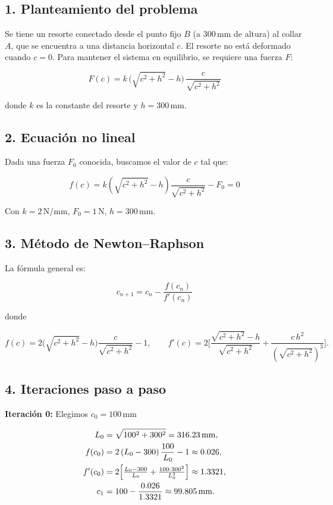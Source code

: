 \documentclass[12pt]{article}
\begin{document}
\subsection*{1. Planteamiento del problema}

Se tiene un resorte conectado desde el punto fijo \(B\) (a \(300\,\mathrm{mm}\) de altura) al collar \(A\), que se encuentra a una distancia horizontal \(c\). El resorte no está deformado cuando \(c = 0\). Para mantener el sistema en equilibrio, se requiere una fuerza \(F\):

\[
F(c) = k \,\bigl(\sqrt{c^2 + h^2} - h\bigr)\,\frac{c}{\sqrt{c^2 + h^2}}
\]

donde \(k\) es la constante del resorte y \(h = 300\,\mathrm{mm}\).

\subsection*{2. Ecuación no lineal}

Dada una fuerza \(F_0\) conocida, buscamos el valor de \(c\) tal que:

\[
f(c) = k \left(\sqrt{c^2 + h^2} - h\right)\frac{c}{\sqrt{c^2 + h^2}} - F_0 = 0
\]

Con \(k = 2\,\mathrm{N/mm}\), \(F_0 = 1\,\mathrm{N}\), \(h = 300\,\mathrm{mm}\).

\subsection*{3. Método de Newton–Raphson}

La fórmula general es:

\[
c_{n+1} = c_n - \frac{f(c_n)}{f'(c_n)}
\]

donde

\[
f(c) = 2\bigl(\sqrt{c^2 + h^2} - h\bigr)\frac{c}{\sqrt{c^2 + h^2}} - 1,
\qquad
f'(c) = 2\Biggl[\frac{\sqrt{c^2+h^2}-h}{\sqrt{c^2+h^2}} + \frac{c\,h^2}{(\sqrt{c^2+h^2})^3}\Biggr].
\]

\subsection*{4. Iteraciones paso a paso}

\textbf{Iteración 0:} Elegimos \(c_0 = 100\,\mathrm{mm}\)

\begin{align*}
L_0 &= \sqrt{100^2 + 300^2} = 316.23\,\mathrm{mm},\\
f(c_0) &= 2\,(L_0 - 300)\,\frac{100}{L_0} - 1 \approx 0.026,\\
f'(c_0) &= 2\Bigl[\tfrac{L_0-300}{L_0} + \tfrac{100\cdot300^2}{L_0^3}\Bigr]\approx1.3321,\\
c_1 &= 100 - \frac{0.026}{1.3321} \approx 99.805\,\mathrm{mm}.
\end{align*}
\end{document}
